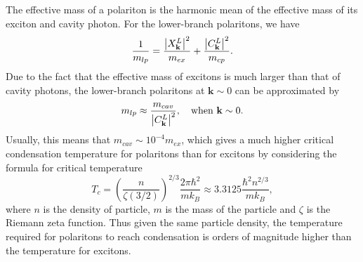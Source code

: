 The effective mass of a polariton is the harmonic mean of the effective mass of its exciton and cavity photon.
For the lower-branch polaritons, we have
%
\begin{equation}
    \frac{1}{m_{lp}} = \frac{\abs{X_\mathbf{k}^L}^2}{m_{ex}} + \frac{\abs{C_\mathbf{k}^L}^2}{m_{cp}}.
    \label{eq:Ch1_mass}
\end{equation}
Due to the fact that the effective mass of excitons is much larger than that of cavity photons, the lower-branch polaritons at $\mathbf{k} \sim 0$ can be approximated by
\begin{equation}
    m_{lp} \approx \frac{m_{cav}}{\abs{C_\mathbf{k}^L}^2},~ ~ ~\textrm{when}~ \mathbf{k} \sim 0.
\end{equation}
Usually, this means that $m_{cav} \sim 10^{-4}m_{ex}$, which gives a much higher critical condensation temperature for polaritons than for excitons by considering the formula for critical temperature~\cite{pítajevskíj2003bose}
\begin{equation}
    T_c = \left(\frac{n}{\zeta\left(3/2\right)}\right)^{2/3} \frac{2\pi\hbar^2}{mk_B} \approx 3.3125 \frac{\hbar^2 n^{2/3}}{mk_B},
    \label{eq:Ch1_t_c}
\end{equation}
where $n$ is the density of particle, $m$ is the mass of the particle and $\zeta$ is the Riemann zeta function.
Thus given the same particle density, the temperature required for polaritons to reach condensation is orders of magnitude higher than the temperature for excitons.

